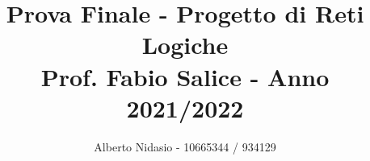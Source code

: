 \title{
    Prova Finale - Progetto di Reti Logiche \\
    \large Prof. Fabio Salice - Anno 2021/2022
}

\author{Alberto Nidasio - 10665344 / 934129}
